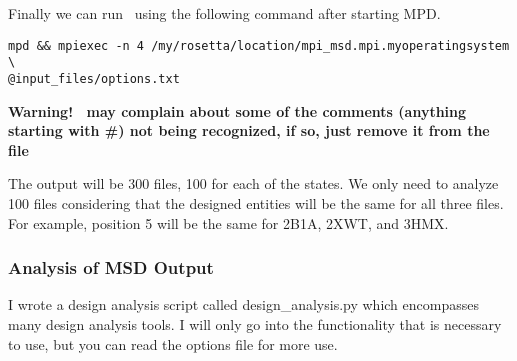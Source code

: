Finally we can run \rosetta~using the following command after starting MPD.

\begin{lstlisting}[breaklines=true]
mpd && mpiexec -n 4 /my/rosetta/location/mpi_msd.mpi.myoperatingsystem \
@input_files/options.txt
\end{lstlisting}
\textbf{Warning! \linebreak \rosetta~may complain about some of the comments (anything starting with \#) not being recognized, if so, just remove it from the file}

The output will be 300 files, 100 for each of the states. We only need to analyze 100 files considering that the designed entities will be the same for all three files. For example, position 5 will be the same for 2B1A, 2XWT, and 3HMX.

\subsubsection{Analysis of MSD Output}
I wrote a design analysis script called design\_analysis.py which encompasses many design analysis tools. I will only go into the functionality that is necessary to use, but you can read the options file for more use.

